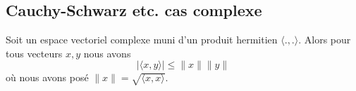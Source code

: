 \subsection{Cauchy-Schwarz etc. cas complexe}

\begin{theorem}      \label{THOooSUCBooFnpkaF}
	Soit un espace vectoriel complexe muni d'un produit hermitien \( \langle ., .\rangle \). Alors pour tous vecteurs \( x,y\) nous avons
	\begin{equation}
		| \langle x, y\rangle  |\leq \| x \|\| y \|
	\end{equation}
	où nous avons posé \( \| x \|=\sqrt{ \langle x, x\rangle  }\).
\end{theorem}

